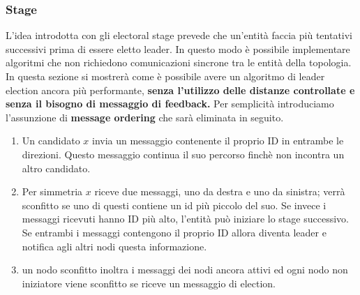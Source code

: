 \documentclass[12pt]{article}
\begin{document}
		\subsubsection{Stage}	
			L'idea introdotta con gli electoral stage prevede che un'entità faccia più tentativi successivi prima di essere eletto leader. In questo modo è possibile implementare algoritmi che non richiedono comunicazioni sincrone tra le entità della topologia.\\
			In questa sezione si mostrerà come è possibile avere un algoritmo di leader election ancora più performante, \textbf{senza l'utilizzo delle distanze controllate e senza il bisogno di messaggio di feedback.} Per semplicità introduciamo l'assunzione di \textbf{message ordering} che sarà eliminata in seguito.
			\begin{enumerate}
				\item Un candidato $x$ invia un messaggio contenente il proprio ID in entrambe le direzioni. Questo messaggio continua il suo percorso finchè non incontra un altro candidato.
				\item Per simmetria $x$ riceve due messaggi, uno da destra e uno da sinistra; verrà sconfitto se uno di questi contiene un id più piccolo del suo. Se invece i messaggi ricevuti hanno ID più alto, l'entità può iniziare lo stage successivo. Se entrambi i messaggi contengono il proprio ID allora diventa leader e notifica agli altri nodi questa informazione.
				\item un nodo sconfitto inoltra i messaggi dei nodi ancora attivi ed ogni nodo non iniziatore viene sconfitto se riceve un messaggio di election.
			\end{enumerate}
\end{document}
